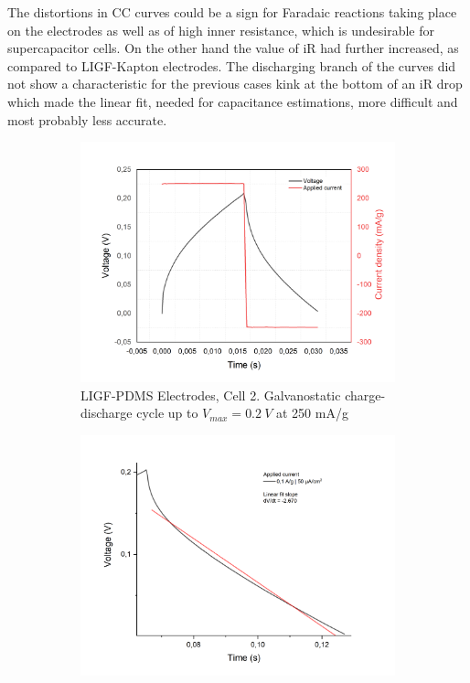 The distortions in CC curves could be a sign for Faradaic reactions taking place on the electrodes as well as of high inner resistance, which is undesirable for supercapacitor cells. On the other hand the value of iR had further increased, as compared to LIGF-Kapton electrodes. The discharging branch of the curves did not show a characteristic for the previous cases kink at the bottom of an iR drop which made the linear fit, needed for capacitance estimations, more difficult and most probably less accurate. 

\begin{figure}[H]
\begin{subfigure}{0.49\textwidth}
\includegraphics[width=1\textwidth]{Figures/Results/Electrochemistry/LIGF-PDMS-NaNO3-Swagelok/Cell2/GCPL_025A_cell2.jpg} 
\captionsetup{width=0.9\linewidth}
\caption{LIGF-PDMS Electrodes, Cell 2. Galvanostatic charge-discharge cycle up to $V_{max}=0.2\:V$ at 250 mA/g}
\label{fig:LIG-PDMS-cell2-CC-12}
\end{subfigure}
\begin{subfigure}{0.49\textwidth}
\includegraphics[width=1\textwidth]{Figures/Results/Electrochemistry/LIGF-PDMS-NaNO3-Swagelok/Cell2/GCPL_V02_Cs_Calc_fit_Cell2.jpg}

\end{subfigure}
\end{figure}
